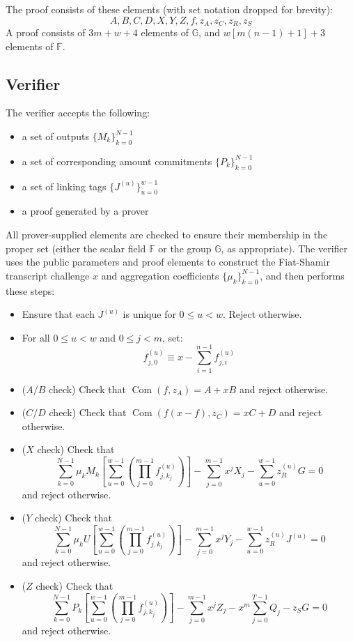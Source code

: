 \documentclass[draft]{article}
\newcommand{\G}{\mathbb{G}}
\newcommand{\F}{\mathbb{F}}
\newcommand{\com}{\operatorname{Com}}
\newcommand{\sumj}{\sum_{j=0}^{m-1}}
\newcommand{\sumk}{\sum_{k=0}^{N-1}}
\newcommand{\sumu}{\sum_{u=0}^{w-1}}
\begin{document}
The proof consists of these elements (with set notation dropped for brevity):
$$A,B,C,D,X,Y,Z,f,z_A,z_C,z_R,z_S$$
A proof consists of $3m + w + 4$ elements of $\G$, and $w\left[ m(n-1) + 1 \right] + 3$ elements of $\F$.


\subsection{Verifier}
The verifier accepts the following:
\begin{itemize}
\item a set of outputs $\{M_k\}_{k=0}^{N-1}$
\item a set of corresponding amount commitments $\{P_k\}_{k=0}^{N-1}$
\item a set of linking tags $\{J^{(u)}\}_{u=0}^{w-1}$
\item a proof generated by a prover
\end{itemize}

All prover-supplied elements are checked to ensure their membership in the proper set (either the scalar field $\F$ or the group $\G$, as appropriate).
The verifier uses the public parameters and proof elements to construct the Fiat-Shamir transcript challenge $x$ and aggregation coefficients $\{\mu_k\}_{k=0}^{N-1}$, and then performs these steps:
\begin{itemize}
\item Ensure that each $J^{(u)}$ is unique for $0 \leq u < w$.
Reject otherwise.
\item For all $0 \leq u < w$ and $0 \leq j < m$, set: $$f^{(u)}_{j,0} \equiv x - \sum_{i=1}^{n-1} f^{(u)}_{j,i}$$
\item{($A/B$ check)} Check that $\com(f,z_A) = A + xB$ and reject otherwise.
\item{($C/D$ check)} Check that $\com(f(x-f),z_C) = xC + D$ and reject otherwise.
\item{($X$ check)} Check that $$\sumk \mu_kM_k \left[ \sumu \left( \prod_{j=0}^{m-1} f^{(u)}_{j,k_j} \right) \right] - \sumj x^jX_j - \sumu z^{(u)}_RG = 0$$ and reject otherwise.
\item{($Y$ check)} Check that $$\sumk \mu_kU \left[ \sumu \left( \prod_{j=0}^{m-1} f^{(u)}_{j,k_j} \right) \right] - \sumj x^jY_j - \sumu z^{(u)}_RJ^{(u)} = 0$$ and reject otherwise.
\item{($Z$ check)} Check that $$\sumk P_k \left[ \sumu \left( \prod_{j=0}^{m-1} f^{(u)}_{j,k_j} \right) \right] - \sumj x^jZ_j - x^m\sum_{j=0}^{T-1} Q_j - z_SG = 0$$ and reject otherwise.
\end{itemize}
\end{document}

